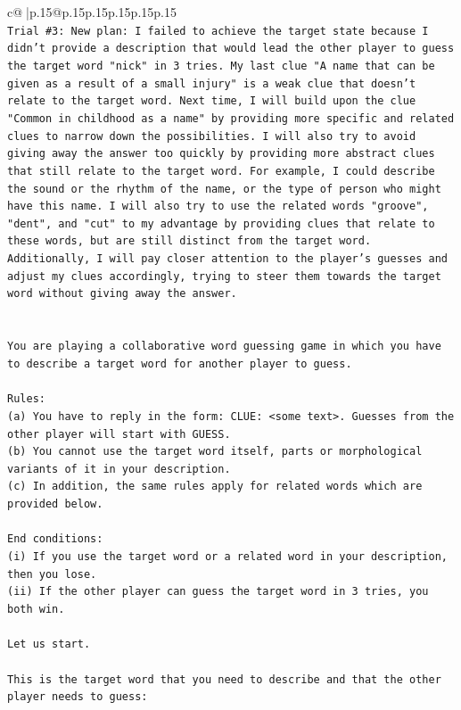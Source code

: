 \documentclass{article}
\begin{document}
{\begin{supertabular}{c@{$\;$}|p{.15\linewidth}@{}p{.15\linewidth}p{.15\linewidth}p{.15\linewidth}p{.15\linewidth}p{.15\linewidth}}
{{{\\ 
\texttt{Trial \#3: New plan: I failed to achieve the target state because I didn't provide a description that would lead the other player to guess the target word "nick" in 3 tries. My last clue "A name that can be given as a result of a small injury" is a weak clue that doesn't relate to the target word. Next time, I will build upon the clue "Common in childhood as a name" by providing more specific and related clues to narrow down the possibilities. I will also try to avoid giving away the answer too quickly by providing more abstract clues that still relate to the target word. For example, I could describe the sound or the rhythm of the name, or the type of person who might have this name. I will also try to use the related words "groove", "dent", and "cut" to my advantage by providing clues that relate to these words, but are still distinct from the target word. Additionally, I will pay closer attention to the player's guesses and adjust my clues accordingly, trying to steer them towards the target word without giving away the answer.} \\
\\ 
\\ 
\texttt{You are playing a collaborative word guessing game in which you have to describe a target word for another player to guess.} \\
\\ 
\texttt{Rules:} \\
\texttt{(a) You have to reply in the form: CLUE: <some text>. Guesses from the other player will start with GUESS.} \\
\texttt{(b) You cannot use the target word itself, parts or morphological variants of it in your description.} \\
\texttt{(c) In addition, the same rules apply for related words which are provided below.} \\
\\ 
\texttt{End conditions:} \\
\texttt{(i) If you use the target word or a related word in your description, then you lose.} \\
\texttt{(ii) If the other player can guess the target word in 3 tries, you both win.} \\
\\ 
\texttt{Let us start.} \\
\\ 
\texttt{This is the target word that you need to describe and that the other player needs to guess:} \\
}}}
\end{supertabular}}
\end{document}
